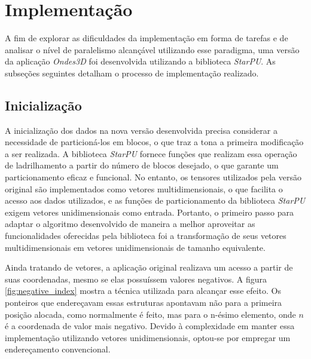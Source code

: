\documentclass[cic,tc]{iiufrgs}
\begin{document}
\section{Implementação}

A fim de explorar as dificuldades da implementação em forma de tarefas e de analisar o nível de paralelismo alcançável utilizando esse paradigma, uma versão da aplicação \textit{Ondes3D} foi
desenvolvida utilizando a biblioteca \textit{StarPU}. As subseções seguintes detalham o processo de implementação realizado.

\subsection{Inicialização}

A inicialização dos dados na nova versão desenvolvida precisa considerar a necessidade de particioná-los em blocos, o que traz a tona a primeira modificação a ser realizada. A biblioteca
\textit{StarPU} fornece funções que realizam essa operação de ladrilhamento a partir do número de blocos desejado, o que garante um particionamento eficaz e funcional. No entanto, os tensores
utilizados pela versão original são implementados como vetores multidimensionais, o que facilita o acesso aos dados utilizados, e as funções de particionamento da biblioteca \textit{StarPU} exigem
vetores unidimensionais como entrada. Portanto, o primeiro passo para adaptar o algoritmo desenvolvido de maneira a melhor aproveitar as funcionalidades oferecidas pela biblioteca foi a transformação 
de seus vetores multidimensionais em vetores unidimensionais de tamanho equivalente.

Ainda tratando de vetores, a aplicação original realizava um acesso a partir de suas coordenadas, mesmo se elas possuíssem valores negativos. A figura \ref{fig:negative_index} mostra a
técnica utilizada para alcançar esse efeito. Os ponteiros que endereçavam essas estruturas apontavam não para a primeira posição alocada, como normalmente é feito, mas para o n-ésimo elemento,
onde $n$ é a coordenada de valor mais negativo. Devido à complexidade em manter essa implementação utilizando vetores unidimensionais, optou-se por empregar um endereçamento convencional.
\end{document}
